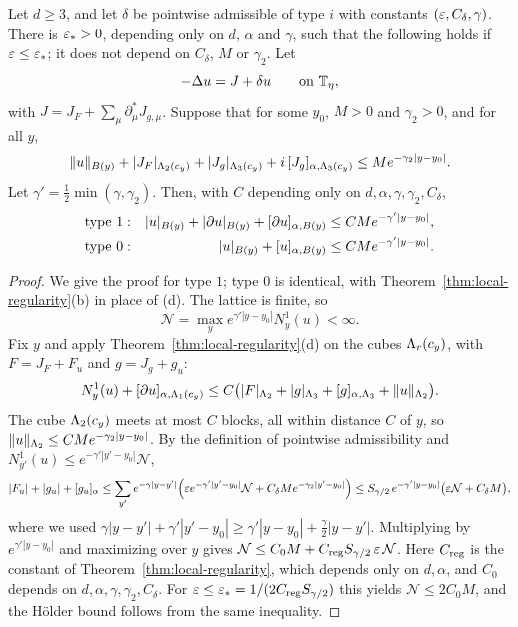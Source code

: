 \begin{lemma}[Bootstrap]\label{lem:bootstrap}
Let $d\ge3$, and let $\delta$ be pointwise admissible of type $i$ with constants $(\varepsilon,C_\delta,\gamma)$. There is $\varepsilon_*>0$, depending only on $d$, $\alpha$ and $\gamma$, such that the following holds if $\varepsilon\le\varepsilon_*$; it does not depend on $C_\delta$, $M$ or $\gamma_2$. Let
\[
-\Delta u=J+\delta u\qquad\text{on }\mathbb T_\eta,
\]
with $J=J_F+\sum_\mu\partial^*_\mu J_{g,\mu}$. Suppose that for some $y_0$, $M>0$ and $\gamma_2>0$, and for all $y$,
\[
\|u\|_{B(y)}+|J_F|_{\Lambda_2(c_y)}+|J_g|_{\Lambda_3(c_y)}+i\,[J_g]_{\alpha,\Lambda_3(c_y)}\le Me^{-\gamma_2|y-y_0|}.
\]
Let $\gamma'=\frac12\min(\gamma,\gamma_2)$. Then, with $C$ depending only on $d,\alpha,\gamma,\gamma_2,C_\delta$,
\begin{align*}
&\text{type }1: & |u|_{B(y)}+|\partial u|_{B(y)}+[\partial u]_{\alpha,B(y)}&\le CMe^{-\gamma'|y-y_0|},\\
&\text{type }0: & |u|_{B(y)}+[u]_{\alpha,B(y)}&\le CMe^{-\gamma'|y-y_0|}.
\end{align*}
\end{lemma}

\begin{proof}
We give the proof for type $1$; type $0$ is identical, with Theorem~\ref{thm:local-regularity}(b) in place of (d). The lattice is finite, so
\[
\mathcal N=\max_ye^{\gamma'|y-y_0|}N^1_y(u)<\infty .
\]
Fix $y$ and apply Theorem~\ref{thm:local-regularity}(d) on the cubes $\Lambda_r(c_y)$, with $F=J_F+F_u$ and $g=J_g+g_u$:
\[
N^1_y(u)+[\partial u]_{\alpha,\Lambda_1(c_y)}\le C\big(|F|_{\Lambda_2}+|g|_{\Lambda_3}+[g]_{\alpha,\Lambda_3}+\|u\|_{\Lambda_2}\big).
\]
The cube $\Lambda_2(c_y)$ meets at most $C$ blocks, all within distance $C$ of $y$, so $\|u\|_{\Lambda_2}\le CMe^{-\gamma_2|y-y_0|}$. By the definition of pointwise admissibility and $N^1_{y'}(u)\le e^{-\gamma'|y'-y_0|}\mathcal N$,
\[
|F_u|+|g_u|+[g_u]_\alpha\le\sum_{y'}e^{-\gamma|y-y'|}\Big(\varepsilon e^{-\gamma'|y'-y_0|}\mathcal N+C_\delta Me^{-\gamma_2|y'-y_0|}\Big)\le S_{\gamma/2}\,e^{-\gamma'|y-y_0|}\big(\varepsilon\mathcal N+C_\delta M\big),
\]
where we used $\gamma|y-y'|+\gamma'|y'-y_0|\ge\gamma'|y-y_0|+\frac\gamma2|y-y'|$. Multiplying by $e^{\gamma'|y-y_0|}$ and maximizing over $y$ gives $\mathcal N\le C_0M+C_{\rm reg}S_{\gamma/2}\,\varepsilon\,\mathcal N$. Here $C_{\rm reg}$ is the constant of Theorem~\ref{thm:local-regularity}, which depends only on $d,\alpha$, and $C_0$ depends on $d,\alpha,\gamma,\gamma_2,C_\delta$. For $\varepsilon\le\varepsilon_*=1/(2C_{\rm reg}S_{\gamma/2})$ this yields $\mathcal N\le2C_0M$, and the H\"older bound follows from the same inequality.
\end{proof}

